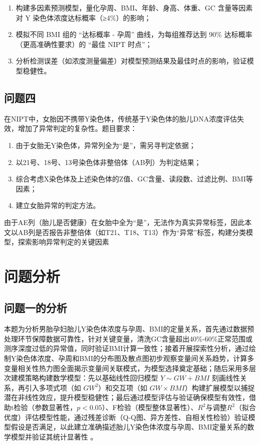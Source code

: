 \documentclass[withoutpreface,bwprint]{cumcmthesis} %
\begin{document}
\begin{enumerate}
    \item 构建多因素预测模型，量化孕周、BMI、年龄、身高、体重、GC 含量等因素对 Y 染色体浓度达标概率（≥4\%）的影响；
    \item 模拟不同 BMI 组的 “达标概率 - 孕周” 曲线，为每组推荐达到 90\% 达标概率（更高准确性要求）的 “最佳 NIPT 时点”；
    \item 分析检测误差（如浓度测量偏差）对模型预测结果及最佳时点的影响，验证模型稳健性。
\end{enumerate}



\subsection{问题四}
在NIPT中，女胎因不携带Y染色体，传统基于Y染色体的胎儿DNA浓度评估失效，增加了异常判定的复杂性。题目要求：
\begin{enumerate}
    \item 由于女胎无Y染色体，异常列全为“是”，需另寻判定依据；
    \item 以21号、18号、13号染色体非整倍体（AB列）为判定结果；
    \item 综合考虑X染色体及上述染色体的Z值、GC含量、读段数、过滤比例、BMI等因素；
    \item 建立女胎异常的判定方法。
\end{enumerate}


由于AE列（胎儿是否健康）在女胎中全为“是”，无法作为真实异常标签，因此本文以AB列是否报告非整倍体（如T21、T18、T13）作为“异常”标签，构建分类模型，探索影响异常判定的关键因素

\section{问题分析}
\subsection{问题一的分析}

本题为分析男胎孕妇胎儿Y染色体浓度与孕周、BMI的定量关系，首先通过数据预处理环节保障数据可靠性，针对关键变量，清洗GC含量超出40\%-60\%正常范围或测序深度过低的异常值，同时验证BMI计算一致性；接着开展探索性分析，通过绘制Y染色体浓度、孕周和BMI的分布图及散点图初步观察变量间关系趋势，计算多变量相关性热力图全面揭示变量间关联模式，为模型选择奠定基础；随后采用多层次建模策略构建数学模型：先以基础线性回归模型 $Y \sim GW + BMI$ 刻画线性关系，再引入多项式项（如 $GW^2$）和交互项（如 $GW \times BMI$）构建扩展模型以捕捉潜在非线性效应，提升模型稳健性；最后通过模型评估与验证确保模型有效性，借助t检验（参数显著性，$p<0.05$）、F检验（模型整体显著性）、$R^2$与调整$R^2$（拟合优度）评估模型性能，通过残差诊断（Q-Q图、异方差性、自相关性检验）验证模型假设是否满足，以此建立准确描述胎儿Y染色体浓度与孕周、BMI定量关系的数学模型并验证其统计显著性 。
\end{document}
